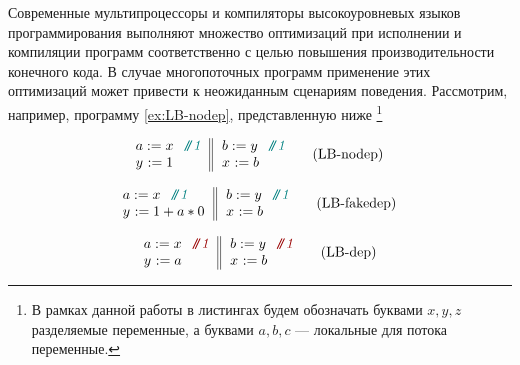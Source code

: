 
Современные мультипроцессоры и компиляторы 
высокоуровневых языков программирования
выполняют множество оптимизаций при исполнении
и компиляции программ соответственно с целью
повышения производительности конечного кода.
В случае многопоточных программ применение этих оптимизаций
может привести к неожиданным сценариям поведения.
Рассмотрим, например, программу \ref{ex:LB-nodep}, представленную ниже%
\footnote{В рамках данной работы в листингах будем обозначать
буквами $x, y, z$ разделяемые переменные,
а буквами $a, b, c$ --- локальные для потока переменные.}

\begin{center}
\begin{minipage}{.32\linewidth}
{\small
\begin{equation}
\inarrII{
  \readInst{}{a}{x} \rfcomment{1} \\
  \writeInst{}{y}{1} \\
}{\readInst{}{b}{y} \rfcomment{1} \\
  \writeInst{}{x}{b}  \\
}
\tag{LB-nodep}\label{ex:LB-nodep}
\end{equation}
}
\end{minipage}
%
\hfill\vline\hfill
\begin{minipage}{.32\linewidth}
{\small
\begin{equation}
\inarrII{
  \readInst{}{a}{x} \rfcomment{1} \\
  \writeInst{}{y}{1 + a * 0} \\
}{\readInst{}{b}{y} \rfcomment{1} \\
  \writeInst{}{x}{b}  \\
}
\tag{LB-fakedep}\label{ex:LB-fakedep}
\end{equation}
}
\end{minipage}
%
\hfill\vline\hfill
%
\begin{minipage}{.32\linewidth}
{\small
\begin{equation}
\inarrII{
  \readInst{}{a}{x} \nocomment{1} \\
  \writeInst{}{y}{a} \\
}{\readInst{}{b}{y} \nocomment{1} \\
  \writeInst{}{x}{b}  \\
}
\tag{LB-dep}\label{ex:LB-dep}
\end{equation}
}
\end{minipage}
\end{center}

